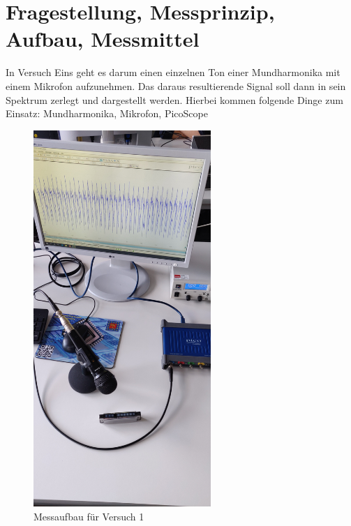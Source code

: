 \documentclass[12pt, oneside, a4paper, \docLanguage]{report}
\begin{document}
\section{Fragestellung, Messprinzip, Aufbau, Messmittel}
\label{chap:VERSUCH_1_FRAGESTELLUNG}
\begin{normalsize}
In Versuch Eins geht es darum einen einzelnen Ton einer Mundharmonika mit einem Mikrofon aufzunehmen.
Das daraus resultierende Signal soll dann in sein Spektrum zerlegt und dargestellt werden.\newline
Hierbei kommen folgende Dinge zum Einsatz: Mundharmonika, Mikrofon, PicoScope\newline
\begin{figure}[H]
\centering
\includegraphics[angle=270,width=0.6\textwidth]{../Picture1.jpg}
\caption{Messaufbau für Versuch 1}
\end{figure}
\end{normalsize}
\end{document}
